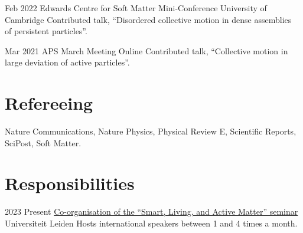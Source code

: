 \documentclass[a4paper]{cvtemplate_en} %
\begin{document}
\begin{cvbody}

\cvitem
	{Feb 2022}
	{}
	{Edwards Centre for Soft Matter Mini-Conference}
	{University of Cambridge }
	{}{}{}
	{}
	{Contributed talk, ``Disordered collective motion in dense assemblies\\ of persistent particles''.\\}


\cvitem
	{Mar 2021}
	{}
	{APS March Meeting}
	{Online \faGlobe}
	{}{}{}
	{}
	{Contributed talk, ``Collective motion in large deviation of active particles''.\\}

\end{cvbody}


\section{Refereeing}

Nature Communications, Nature Physics, Physical Review E,  Scientific Reports, SciPost, Soft Matter.
\vspace{25pt}


\section{Responsibilities}

\begin{cvbody}

\cvitem
	{2023}
	{Present}
	{\href{https://slam-leiden.nl}{Co-organisation of the ``Smart, Living, and Active Matter'' seminar}}
	{Universiteit Leiden \vspace{-5pt}}
	{}{}{}
    {}
	{Hosts international speakers between 1 and 4 times a month.}

\end{cvbody}
\end{document}
